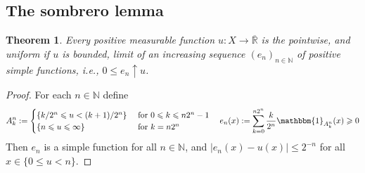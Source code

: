 \documentclass[11pt, a4paper, openany]{book}
\newtheorem{thm}{Theorem}\newtheorem{lem}{Lemma}\newtheorem{crl}{Corollary}
\theoremstyle{definition}
\newcommand{\er}{\overline{\mathbb{R}}}
\begin{document}
\subsection{The sombrero lemma}
    \begin{thm}\label{sombrero}
        Every positive measurable function $u:X\rightarrow \er$ is the pointwise, and uniform if $u$ is bounded, limit of an increasing sequence $(e_n)_{n\in\mathbb{N}}$ of positive simple functions, i.e., $0\leqslant e_n\uparrow u$.
    \end{thm}
    \begin{proof}
        For each $n\in\mathbb{N}$ define
        \[
            A^n_k:=\begin{cases}
                \{{k}/{2^n}\leqslant u<{(k+1)}/{2^n}\}\,\, &\text{for }0\leqslant k\leqslant n2^n-1\\
                \{n\leqslant u\leqslant\infty\}\,\,&\text{for }k=n2^n
         \end{cases}\quad e_n(x):=\sum_{k=0}^{n2^n}\frac{k}{2^n}\mathbbm{1}_{A^n_k}(x)\geqslant 0
        \]
        Then $e_n$ is a simple function for all $n\in\mathbb{N}$, and $|e_n(x)-u(x)|\leqslant 2^{-n}$ for all $x\in \{0\leqslant u<n\}$.
    \end{proof}
\end{document}
